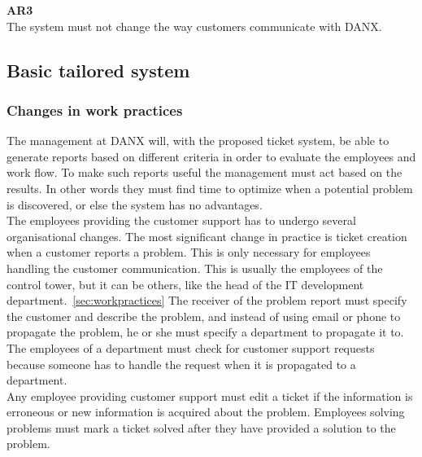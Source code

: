 \textbf{AR3} \\
The system must not change the way customers communicate with DANX.

\subsection{Basic tailored system}
\subsubsection{Changes in work practices}
The management at DANX will, with the proposed ticket system, be able to generate reports based on different criteria in order to evaluate the employees and work flow. To make such reports useful the management must act based on the results. In other words they must find time to optimize when a potential problem is discovered, or else the system has no advantages.\\
The employees providing the customer support has to undergo several organisational changes. The most significant change in practice is ticket creation when a customer reports a problem. This is only necessary for employees handling the customer communication. This is usually the employees of the control tower, but it can be others, like the head of the IT development department.~\ref{sec:workpractices} The receiver of the problem report must specify the customer and describe the problem, and instead of using email or phone to propagate the problem, he or she must specify a department to propagate it to.\\
The employees of a department must check for customer support requests because someone has to handle the request when it is propagated to a department. \\
Any employee providing customer support must edit a ticket if the information is erroneous or new information is acquired about the problem. Employees solving problems must mark a ticket solved after they have provided a solution to the problem.

